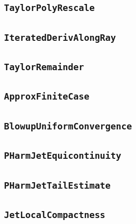 \documentclass[11pt]{amsart}
\theoremstyle{definition}
\begin{document}
\subsection{\texorpdfstring{\texttt{TaylorPolyRescale}}{TaylorPolyRescale}}\label{node:TaylorPolyRescale}


\subsection{\texorpdfstring{\texttt{IteratedDerivAlongRay}}{IteratedDerivAlongRay}}\label{node:IteratedDerivAlongRay}


\subsection{\texorpdfstring{\texttt{TaylorRemainder}}{TaylorRemainder}}\label{node:TaylorRemainder}


\subsection{\texorpdfstring{\texttt{ApproxFiniteCase}}{ApproxFiniteCase}}\label{node:ApproxFiniteCase}


\subsection{\texorpdfstring{\texttt{BlowupUniformConvergence}}{BlowupUniformConvergence}}\label{node:BlowupUniformConvergence}


\subsection{\texorpdfstring{\texttt{PHarmJetEquicontinuity}}{PHarmJetEquicontinuity}}\label{node:PHarmJetEquicontinuity}


\subsection{\texorpdfstring{\texttt{PHarmJetTailEstimate}}{PHarmJetTailEstimate}}\label{node:PHarmJetTailEstimate}


\subsection{\texorpdfstring{\texttt{JetLocalCompactness}}{JetLocalCompactness}}\label{node:JetLocalCompactness}

\end{document}
